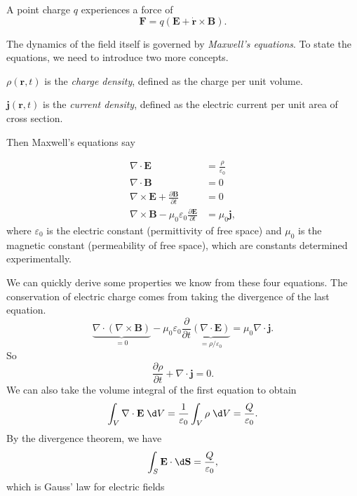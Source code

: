 \documentclass[a4paper]{article}
\begin{document}
\begin{law}
  A point charge $q$ experiences a force of
  \[
    \mathbf{F} = q(\mathbf{E} + \dot{\mathbf{r}} \times \mathbf{B}).
  \]
\end{law}

The dynamics of the field itself is governed by \emph{Maxwell's equations}. To state the equations, we need to introduce two more concepts.

\begin{defi}
  $\rho(\mathbf{r}, t)$ is the \emph{charge density}, defined as the charge per unit volume.

  $\mathbf{j}(\mathbf{r}, t)$ is the \emph{current density}, defined as the electric current per unit area of cross section.
\end{defi}

Then Maxwell's equations say
\begin{law}
  \begin{align*}
    \nabla\cdot \mathbf{E} &= \frac{\rho}{\varepsilon_0}\\
    \nabla\cdot \mathbf{B} &= 0\\
    \nabla\times \mathbf{E} + \frac{\partial \mathbf{B}}{\partial t} &= 0\\
    \nabla\times \mathbf{B} - \mu_0\varepsilon_0 \frac{\partial \mathbf{E}}{\partial t} &= \mu_0 \mathbf{j},
  \end{align*}
  where $\varepsilon_0$ is the electric constant (permittivity of free space) and $\mu_0$ is the magnetic constant (permeability of free space), which are constants determined experimentally.
\end{law}

We can quickly derive some properties we know from these four equations. The conservation of electric charge comes from taking the divergence of the last equation.
\[
  \underbrace{\nabla\cdot (\nabla\times \mathbf{B})}_{=0} - \mu_0\varepsilon_0\frac{\partial}{\partial t} \underbrace{(\nabla\cdot \mathbf{E})}_{=\rho/\varepsilon_0} = \mu_0 \nabla\cdot \mathbf{j}.
\]
So
\[
  \frac{\partial \rho}{\partial t} + \nabla\cdot \mathbf{j} = 0.
\]
We can also take the volume integral of the first equation to obtain
\[
  \int_V\nabla\cdot \mathbf{E}\;\d V = \frac{1}{\varepsilon_0} \int_V \rho\;\d V = \frac{Q}{\varepsilon_0}.
\]
By the divergence theorem, we have
\[
  \int_S \mathbf{E}\cdot \d \mathbf{S} = \frac{Q}{\varepsilon_0},
\]
which is Gauss' law for electric fields
\end{document}
